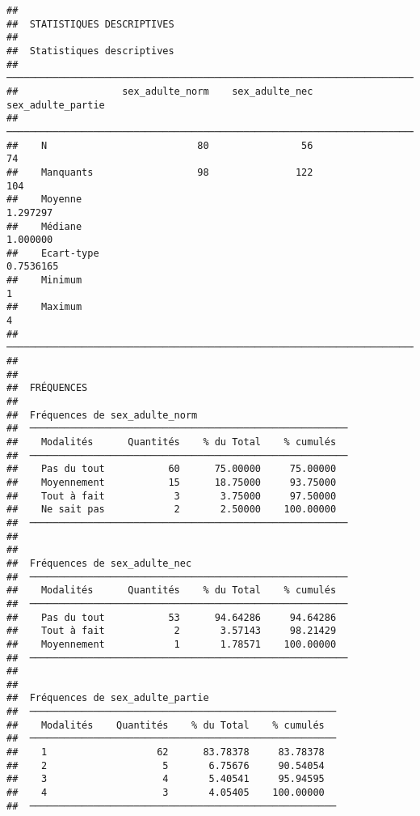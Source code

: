 \documentclass[
]{article}
\begin{document}
\begin{verbatim}
## 
##  STATISTIQUES DESCRIPTIVES
## 
##  Statistiques descriptives                                                
##  ──────────────────────────────────────────────────────────────────────── 
##                  sex_adulte_norm    sex_adulte_nec    sex_adulte_partie   
##  ──────────────────────────────────────────────────────────────────────── 
##    N                          80                56                   74   
##    Manquants                  98               122                  104   
##    Moyenne                                                     1.297297   
##    Médiane                                                     1.000000   
##    Ecart-type                                                 0.7536165   
##    Minimum                                                            1   
##    Maximum                                                            4   
##  ──────────────────────────────────────────────────────────────────────── 
## 
## 
##  FRÉQUENCES
## 
##  Fréquences de sex_adulte_norm                           
##  ─────────────────────────────────────────────────────── 
##    Modalités      Quantités    % du Total    % cumulés   
##  ─────────────────────────────────────────────────────── 
##    Pas du tout           60      75.00000     75.00000   
##    Moyennement           15      18.75000     93.75000   
##    Tout à fait            3       3.75000     97.50000   
##    Ne sait pas            2       2.50000    100.00000   
##  ─────────────────────────────────────────────────────── 
## 
## 
##  Fréquences de sex_adulte_nec                            
##  ─────────────────────────────────────────────────────── 
##    Modalités      Quantités    % du Total    % cumulés   
##  ─────────────────────────────────────────────────────── 
##    Pas du tout           53      94.64286     94.64286   
##    Tout à fait            2       3.57143     98.21429   
##    Moyennement            1       1.78571    100.00000   
##  ─────────────────────────────────────────────────────── 
## 
## 
##  Fréquences de sex_adulte_partie                       
##  ───────────────────────────────────────────────────── 
##    Modalités    Quantités    % du Total    % cumulés   
##  ───────────────────────────────────────────────────── 
##    1                   62      83.78378     83.78378   
##    2                    5       6.75676     90.54054   
##    3                    4       5.40541     95.94595   
##    4                    3       4.05405    100.00000   
##  ─────────────────────────────────────────────────────
\end{verbatim}
\end{document}
